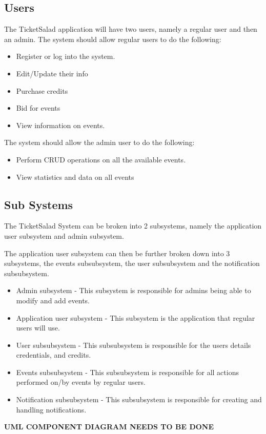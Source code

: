 \documentclass[11pt]{article}
\begin{document}
	\subsection{Users}
	The TicketSalad application will have two users, namely a regular user and then an admin.
	The system should allow regular users to do the following:
	\begin{itemize}
		\item Register or log into the system.
		\item Edit/Update their info
		\item Purchase credits
		\item Bid for events
		\item View information on events.
	\end{itemize} 
	The system should allow the admin user to do the following:
	\begin{itemize}
		\item Perform CRUD operations on all the available events.
		\item View statistics and data on all events
	\end{itemize}
	\subsection{Sub Systems}
	The TicketSalad System can be broken into 2 subsystems, namely the application user subsystem and admin subsystem. 

	The application user subsystem can then be further broken down into 3 subsystems, the events subsubsystem, the user subsubsystem and the notification subsubsystem.
	\begin{itemize}
		\item Admin subsystem - This subsystem is responsible for admins being able to modify and add events.
		\item Application user subsystem - This subsystem is the application that regular users will use.
		\item User subsubsystem - This subsubsystem is responsible for the users details credentials, and credits.
		\item Events subsubsystem - This subsubsystem is responsible for all actions performed on/by events by regular users.
		\item Notification subsubsystem - This subsubsystem is responsible for creating and handling notifications.
	\end{itemize}
	\textbf{UML COMPONENT DIAGRAM NEEDS TO BE DONE}
\end{document}
